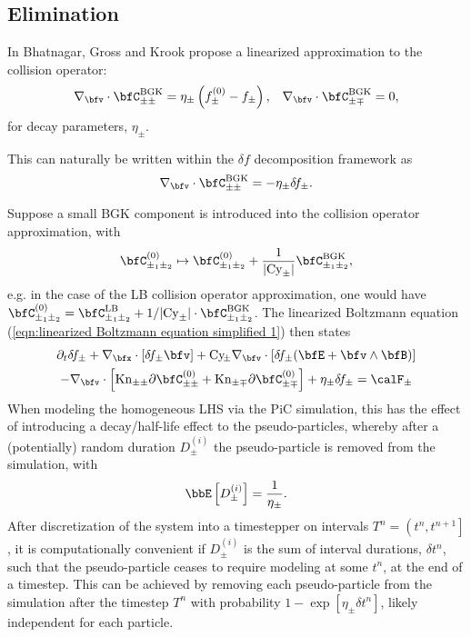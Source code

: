 \subsection*{Elimination}
    \begin{definition}
        In \cite{Bhatnagar_Gross_Krook_1954} Bhatnagar, Gross and Krook propose a linearized approximation to the collision operator:
        \begin{align}
            \nabla_{\bfv}\cdot\bfC_{\pm\pm}^{\rm BGK}  =  \eta_{\pm}\left(f_{\pm}^{(0)} - f_{\pm}\right),  &&
            \nabla_{\bfv}\cdot\bfC_{\pm\mp}^{\rm BGK}  =  0,
        \end{align}
        for decay parameters, $\eta_{\pm}$.
    \end{definition}
    This can naturally be written within the $\delta\!f$ decomposition framework as
    \begin{equation}
        \nabla_{\bfv}\cdot\bfC_{\pm\pm}^{\rm BGK}  =  - \eta_{\pm}\delta\!f_{\pm}.
    \end{equation}

    \shortline

    Suppose a small BGK component is introduced into the collision operator approximation, with
    \begin{equation}
        \bfC_{\pm_{1}\pm_{2}}^{(0)}  \mapsto  \bfC_{\pm_{1}\pm_{2}}^{(0)} + \frac{1}{|\rmCy_{\pm}|}\bfC_{\pm_{1}\pm_{2}}^{\rm BGK},
    \end{equation}
    e.g. in the case of the LB collision operator approximation, one would have $\bfC_{\pm_{1}\pm_{2}}^{(0)} = \bfC_{\pm_{1}\pm_{2}}^{\rm LB} + 1/|\rmCy_{\pm}|\cdot\bfC_{\pm_{1}\pm_{2}}^{\rm BGK}$. The linearized Boltzmann equation (\ref{eqn:linearized Boltzmann equation simplified 1}) then states
    \begin{multline}
        \partial_{t}\delta\!f_{\pm}
        + \nabla_{\bfx}\cdot[\delta\!f_{\pm}\bfv]
        + \rmCy\!_{\pm}\nabla_{\bfv}\cdot[\delta\!f_{\pm}(\bfE + \bfv\wedge\bfB)]  \\
        - \nabla_{\bfv}\cdot\left[\rmKn_{\pm\pm}\partial\bfC_{\pm\pm}^{(0)} + \rmKn_{\pm\mp}\partial\bfC_{\pm\mp}^{(0)}\right]
        + \eta_{\pm}\delta\!f_{\pm}
        =  \calF_{\pm}
    \end{multline}
    When modeling the homogeneous LHS via the PiC simulation, this has the effect of introducing a decay/half-life effect to the pseudo-particles, whereby after a (potentially) random duration $D_{\pm}^{(i)}$ the pseudo-particle is removed from the simulation, with
    \begin{equation}
        \bbE\left[D_{\pm}^{(i)}\right] = \frac{1}{\eta_{\pm}}.
    \end{equation}
    After discretization of the system into a timestepper on intervals $T^{n} = \left(t^{n}, t^{n + 1}\right]$, it is computationally convenient if $D_{\pm}^{(i)}$ is the sum of interval durations, $\delta t^{n}$, such that the pseudo-particle ceases to require modeling at some $t^{n}$, at the end of a timestep. This can be achieved by removing each pseudo-particle from the simulation after the timestep $T^{n}$ with probability $1 - \exp\left[\eta_{\pm}\delta t^{n}\right]$, likely independent for each particle.
    